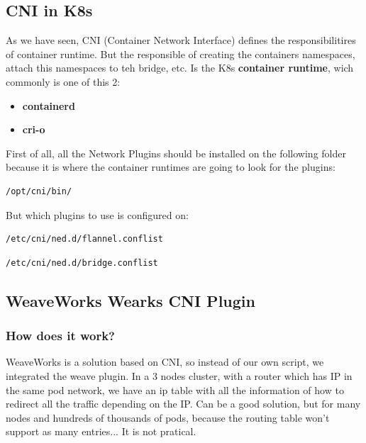 \documentclass{article}
\newenvironment{codetemplate}[1][]{%
  \mybasecolorbox[#1]
  \itshape
}{%
  \endmybasecolorbox
}
\begin{document}
\subsection{CNI in K8s}
As we have seen, CNI (Container Network Interface) defines the responsibilitires of container runtime. But the responsible of creating the containers namespaces, attach this namespaces to teh bridge, etc. Is the K8s \textbf{container runtime}, wich commonly is one of this 2:
\begin{itemize}
    \item \textbf{containerd}
    \item \textbf{cri-o}
\end{itemize}

First of all, all the Network Plugins should be installed on the following folder because it is where the container
runtimes are going to look for the plugins:
\begin{codetemplate}{}
\begin{verbatim}
/opt/cni/bin/
\end{verbatim}
\end{codetemplate}

But which plugins to use is configured on:
\begin{codetemplate}{}
\begin{verbatim}
/etc/cni/ned.d/flannel.conflist 
\end{verbatim}
\end{codetemplate}
\begin{codetemplate}{}
\begin{verbatim}
/etc/cni/ned.d/bridge.conflist 
\end{verbatim}
\end{codetemplate}

\subsection{WeaveWorks Wearks CNI Plugin}
\subsubsection{How does it work?}
WeaveWorks is a solution based on CNI, so instead of our own script, we integrated the weave plugin. 
In a 3 nodes cluster, with a router which has IP in the same pod network, we have an ip table with all the information of how to redirect all the traffic depending on the IP. Can be a good solution, but for many nodes and hundreds of thousands of pods, because the routing table won't support as many entries... It is not pratical.
\end{document}
